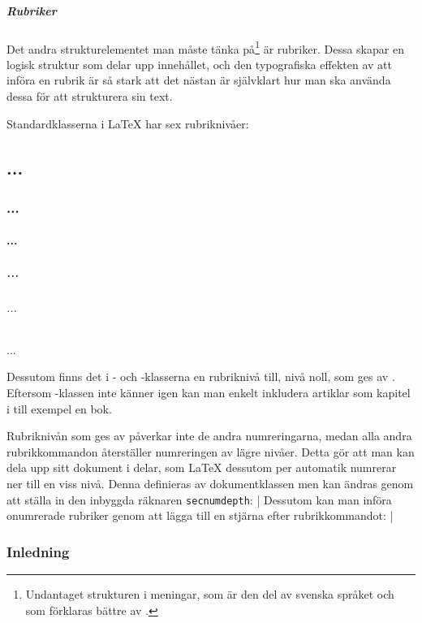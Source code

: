\documentclass[../../latex.tex]{subfiles}
\begin{document}
\subsubsection{Rubriker}
Det andra strukturelementet man måste tänka på\footnote{Undantaget
strukturen i meningar, som är den del av svenska språket och som förklaras
bättre av .} är rubriker. Dessa skapar en logisk
struktur som delar upp innehållet, och den typografiska effekten av att
införa en rubrik är så stark att det nästan är självklart hur man ska
använda dessa för att strukturera sin text.

Standardklasserna i \LaTeX{} har sex rubriknivåer:
\begin{latexcode}
\part{...}          %
\section{...}       %
\subsection{...}    %
\subsubsection{...} %
\paragraph{...}     %
\subparagraph{...}  %
\end{latexcode}

Dessutom finns det i - och -klasserna en
rubriknivå till, nivå noll, som ges av . 
Eftersom -klassen inte känner igen  kan man
enkelt inkludera artiklar som kapitel i till exempel en bok.

Rubriknivån som ges av  påverkar inte de andra numreringarna,
medan alla andra rubrikkommandon återställer numreringen av lägre nivåer.
Detta gör att man kan dela upp sitt dokument i delar, som
\LaTeX{} dessutom per automatik numrerar ner till en viss nivå. Denna
definieras av dokumentklassen men kan ändras genom att ställa in
den inbyggda räknaren \texttt{secnumdepth}:
\latex|\setcounter{secnumdepth}{2} %
Dessutom kan man införa onumrerade rubriker genom att lägga till en
stjärna efter rubrikkommandot:
\latex|\section*{Inledning} %
\end{document}
